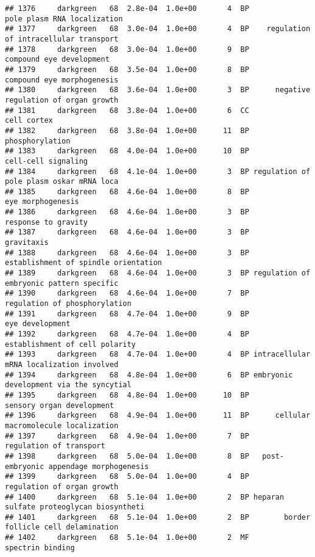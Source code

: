 \documentclass[]{article}
\begin{document}
\begin{verbatim}
## 1376     darkgreen   68  2.8e-04  1.0e+00       4  BP              pole plasm RNA localization
## 1377     darkgreen   68  3.0e-04  1.0e+00       4  BP    regulation of intracellular transport
## 1378     darkgreen   68  3.0e-04  1.0e+00       9  BP                 compound eye development
## 1379     darkgreen   68  3.5e-04  1.0e+00       8  BP               compound eye morphogenesis
## 1380     darkgreen   68  3.6e-04  1.0e+00       3  BP      negative regulation of organ growth
## 1381     darkgreen   68  3.8e-04  1.0e+00       6  CC                              cell cortex
## 1382     darkgreen   68  3.8e-04  1.0e+00      11  BP                          phosphorylation
## 1383     darkgreen   68  4.0e-04  1.0e+00      10  BP                      cell-cell signaling
## 1384     darkgreen   68  4.1e-04  1.0e+00       3  BP regulation of pole plasm oskar mRNA loca
## 1385     darkgreen   68  4.6e-04  1.0e+00       8  BP                        eye morphogenesis
## 1386     darkgreen   68  4.6e-04  1.0e+00       3  BP                      response to gravity
## 1387     darkgreen   68  4.6e-04  1.0e+00       3  BP                               gravitaxis
## 1388     darkgreen   68  4.6e-04  1.0e+00       3  BP     establishment of spindle orientation
## 1389     darkgreen   68  4.6e-04  1.0e+00       3  BP regulation of embryonic pattern specific
## 1390     darkgreen   68  4.6e-04  1.0e+00       7  BP            regulation of phosphorylation
## 1391     darkgreen   68  4.7e-04  1.0e+00       9  BP                          eye development
## 1392     darkgreen   68  4.7e-04  1.0e+00       4  BP           establishment of cell polarity
## 1393     darkgreen   68  4.7e-04  1.0e+00       4  BP intracellular mRNA localization involved
## 1394     darkgreen   68  4.8e-04  1.0e+00       6  BP embryonic development via the syncytial 
## 1395     darkgreen   68  4.8e-04  1.0e+00      10  BP                sensory organ development
## 1396     darkgreen   68  4.9e-04  1.0e+00      11  BP      cellular macromolecule localization
## 1397     darkgreen   68  4.9e-04  1.0e+00       7  BP                  regulation of transport
## 1398     darkgreen   68  5.0e-04  1.0e+00       8  BP   post-embryonic appendage morphogenesis
## 1399     darkgreen   68  5.0e-04  1.0e+00       4  BP               regulation of organ growth
## 1400     darkgreen   68  5.1e-04  1.0e+00       2  BP heparan sulfate proteoglycan biosyntheti
## 1401     darkgreen   68  5.1e-04  1.0e+00       2  BP        border follicle cell delamination
## 1402     darkgreen   68  5.1e-04  1.0e+00       2  MF                         spectrin binding

\end{verbatim}
\end{document}
